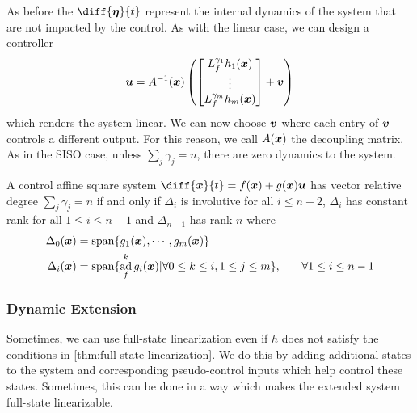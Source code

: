 As before the $\diff{\bs{\eta}}{t}$ represent the internal dynamics of the
system that are not impacted by the control. As with the linear case, we can
design a controller \[
	\boldsymbol{u} = A^{-1}(\boldsymbol{x})\left(
	\begin{bmatrix}
		L_f^{\gamma_1}h_1(\boldsymbol{x})\\
		\vdots\\
		L_f^{\gamma_m}h_m(\boldsymbol{x})\\
	\end{bmatrix} + \boldsymbol{v}\right)
\]
which renders the system linear. We can now choose $\boldsymbol{v}$ where each entry of
$\boldsymbol{v}$ controls a different output. For this reason, we call $A(\boldsymbol{x})$ the
decoupling matrix. As in the SISO case, unless $\sum_j \gamma_j = n$, there are
zero dynamics to the system.
\begin{theorem}
	A control affine square system $\diff{\bs{x}}{t} = f(\bs{x}) +
	g(\bs{x})\bs{u}$ has vector relative degree $\sum_j \gamma_j = n$ if and only
	if $\Delta_i$ is involutive for all $i \leq n-2$, $\Delta_i$ has constant rank
	for all $1 \leq i \leq n-1$ and $\Delta_{n-1}$ has rank $n$ where \[
		\begin{aligned}
			\Delta_0(\boldsymbol{x}) &= \text{span}\{g_1(\boldsymbol{x}),\cdots,g_m(\boldsymbol{x})\}\\
			\Delta_i(\boldsymbol{x}) &= \text{span}\{\operatorname*{ad}_f^kg_i(\boldsymbol{x})| \forall 0 \leq k \leq i,
			1 \leq j \leq m\}, &\quad \forall 1 \leq i \leq n-1
		\end{aligned}
	\]
	\label{thm:full-state-linearization-mimo}
\end{theorem}
\subsubsection{Dynamic Extension}
Sometimes, we can use full-state linearization even if $h$ does not satisfy the
conditions in \cref{thm:full-state-linearization}. We do this by adding
additional states to the system and corresponding pseudo-control inputs which
help control these states. Sometimes, this can be done in a way which makes the
extended system full-state linearizable.
